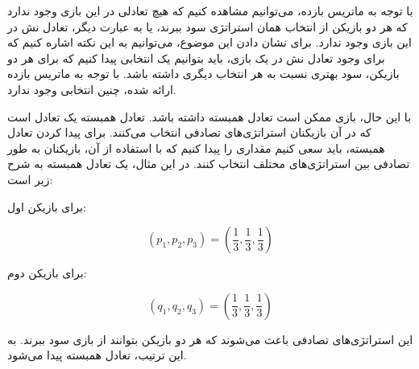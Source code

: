 با توجه به ماتریس بازده، می‌توانیم مشاهده کنیم که هیچ تعادلی در این بازی وجود ندارد که هر دو بازیکن از انتخاب همان استراتژی سود ببرند، یا به عبارت دیگر، تعادل نش در این بازی وجود ندارد. برای نشان دادن این موضوع، می‌توانیم به این نکته اشاره کنیم که برای وجود تعادل نش در یک بازی، باید بتوانیم یک انتخابی پیدا کنیم که برای هر دو بازیکن، سود بهتری نسبت به هر انتخاب دیگری داشته باشد. با توجه به ماتریس بازده ارائه شده، چنین انتخابی وجود ندارد.

با این حال، بازی ممکن است تعادل همبسته داشته باشد. تعادل همبسته یک تعادل است که در آن بازیکنان استراتژی‌های تصادفی انتخاب می‌کنند. برای پیدا کردن تعادل همبسته، باید سعی کنیم مقداری را پیدا کنیم که با استفاده از آن، بازیکنان به طور تصادفی بین استراتژی‌های مختلف انتخاب کنند. در این مثال، یک تعادل همبسته به شرح زیر است:

برای بازیکن اول:

$$
(p_1, p_2, p_3) = ( \frac{1}{3} , \frac{1}{3} , \frac{1}{3} )
$$

برای بازیکن دوم:

$$
(q_1, q_2, q_3) = ( \frac{1}{3} , \frac{1}{3} , \frac{1}{3} )
$$

این استراتژی‌های تصادفی باعث می‌شوند که هر دو بازیکن بتوانند از بازی سود ببرند. به این ترتیب، تعادل همبسته پیدا می‌شود.